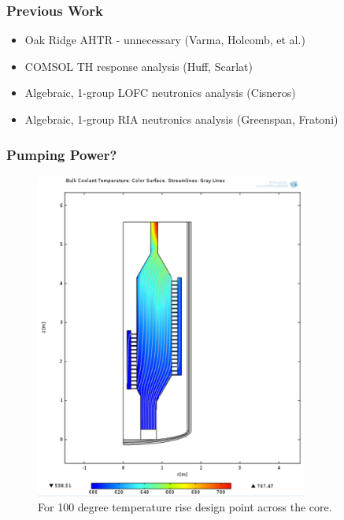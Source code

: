 \begin{frame}[fragile]
  \frametitle{Previous Work}
  \begin{itemize}
    \item Oak Ridge AHTR - unnecessary (Varma, Holcomb, et al.)
    \item COMSOL TH response analysis (Huff, Scarlat)
    \item Algebraic, 1-group LOFC neutronics analysis (Cisneros)
    \item Algebraic, 1-group RIA neutronics analysis (Greenspan, Fratoni)
  \end{itemize}

\end{frame}

\begin{frame}[fragile]
  \frametitle{Pumping Power?}
  \begin{figure}[htbp!]
    \begin{center}
      \includegraphics[width=0.8\textwidth]{./priorart/coolant_temps_100_deg_rise.eps}
    \end{center}
    \caption{For 100 degree temperature rise design point across the core.}
    \label{fig:200degrise}
  \end{figure}
\end{frame}

